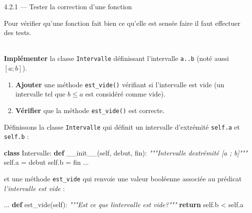 \documentclass[a4paper,17pt]{extarticle}
\newenvironment{eleve}%
{\begin{activite}\color{noiramu}\\[-0.5cm]}
{\end{activite}}
\providecommand{\tightlist}{%
      \setlength{\itemsep}{0pt}\setlength{\parskip}{0pt}}
\newenvironment{Shaded}{}{}
\newcommand{\KeywordTok}[1]{\textcolor[rgb]{0.00,0.44,0.13}{\textbf{{#1}}}}
\newcommand{\CommentTok}[1]{\textcolor[rgb]{0.38,0.63,0.69}{\textit{{#1}}}}
\newcommand{\FunctionTok}[1]{\textcolor[rgb]{0.02,0.16,0.49}{{#1}}}
\newcommand{\NormalTok}[1]{{#1}}
\newcommand{\VariableTok}[1]{\textcolor[rgb]{0.10,0.09,0.49}{{#1}}}
\newcommand{\ControlFlowTok}[1]{\textcolor[rgb]{0.00,0.44,0.13}{\textbf{{#1}}}}
\newcommand{\OperatorTok}[1]{\textcolor[rgb]{0.40,0.40,0.40}{{#1}}}
\begin{document}
    4.2.1 --- Tester la correction d'une fonction

    Pour vérifier qu'une fonction fait bien ce qu'elle est sensée faire il
faut effectuer des tests.
\begin{eleve}
    \textbf{Implémenter} la classe \texttt{Intervalle} définissant
l'intervalle \texttt{a..b} (noté aussi \([a ; b]\)).

\begin{enumerate}
\def\labelenumi{\arabic{enumi}.}
\setcounter{enumi}{1}
\tightlist
\item
  \textbf{Ajouter} une méthode \texttt{est\_vide()} vérifiant si
  l'intervalle est vide (un intervalle tel que \(b \leq a\) est
  considéré comme vide).
\item
  \textbf{Vérifier} que la méthode \texttt{est\_vide()} est correcte.
\end{enumerate}
        
        \end{eleve}\begin{reponse}
    Définissons la classe \texttt{Intervalle} qui définit un intervalle
d'extrémité \texttt{self.a} et \texttt{self.b} :

\begin{Shaded}
\begin{Highlighting}[]
\KeywordTok{class}\NormalTok{ Intervalle:}
    \KeywordTok{def} \FunctionTok{\_\_init\_\_}\NormalTok{(}\VariableTok{self}\NormalTok{, debut, fin):}
        \CommentTok{"""Intervalle d\textquotesingle{}extrémité [a ; b]"""}
        \VariableTok{self}\NormalTok{.a }\OperatorTok{=}\NormalTok{ debut}
        \VariableTok{self}\NormalTok{.b }\OperatorTok{=}\NormalTok{ fin}
\NormalTok{    ...}
\end{Highlighting}
\end{Shaded}

et une méthode \texttt{est\_vide} qui renvoie une valeur booléenne
associée au prédicat \emph{l'intervalle est vide} :

\begin{Shaded}
\begin{Highlighting}[]
\NormalTok{    ...}
    \KeywordTok{def}\NormalTok{ est\_vide(}\VariableTok{self}\NormalTok{):}
        \CommentTok{"""Est ce que l\textquotesingle{}intervalle est vide?"""}
        \ControlFlowTok{return} \VariableTok{self}\NormalTok{.b }\OperatorTok{\textless{}} \VariableTok{self}\NormalTok{.a}
\end{Highlighting}
\end{Shaded}


\end{reponse}
\end{document}
